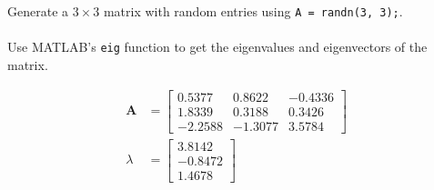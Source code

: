 Generate a $3 \times 3$ matrix with random entries using \texttt{A = randn(3, 3);}. \ \\ \\
Use MATLAB’s \texttt{eig} function to get the eigenvalues and eigenvectors of the matrix.

\begin{solution}
    \begin{align*}
        \boldsymbol{A} &= \begin{bmatrix}
             0.5377 &  0.8622 & -0.4336 \\
             1.8339 &  0.3188 &  0.3426 \\
            -2.2588 & -1.3077 &  3.5784
        \end{bmatrix} \\
        \lambda &= \begin{bmatrix}
            3.8142 \\
           -0.8472 \\
            1.4678
        \end{bmatrix}
    \end{align*}
\end{solution}